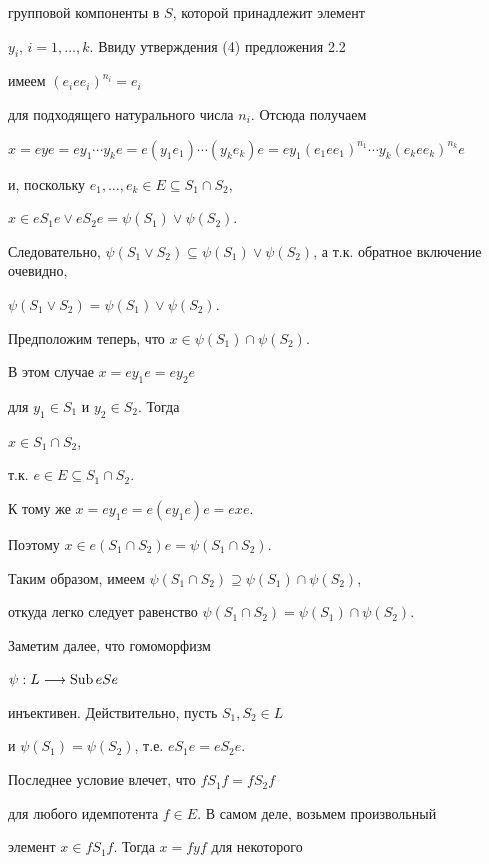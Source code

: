 \begin{pf}
групповой компоненты в $S$, которой принадлежит элемент


$y_i$, $i=1,\dotsc,k$. Ввиду утверждения (4) предложения 2.2


имеем $(e_i ee_i)^{n_i} = e_i$


для подходящего натурального числа $n_i$. Отсюда получаем


$x = eye = ey_1\dotsb y_ke = e(y_1e_1)\dotsb(y_ke_k)e =


ey_1(e_1ee_1)^{n_1}\dotsb y_k(e_kee_k)^{n_k}e$


и, поскольку $e_1,\dotsc,e_k \in E \subseteq S_1 \cap S_2$,


$x \in eS_1e \vee eS_2e = \psi(S_1) \vee \psi(S_2)$.


Следовательно, $\psi(S_1 \vee S_2) \subseteq \psi(S_1) \vee


\psi(S_2)$, а т.к. обратное включение очевидно,


$\psi(S_1 \vee S_2) = \psi(S_1) \vee \psi(S_2)$.


Предположим теперь, что $x \in \psi(S_1) \cap \psi(S_2)$.


В этом случае $x = ey_1e = ey_2e$


для $y_1 \in S_1$ и $y_2 \in S_2$. Тогда


$x \in S_1 \cap S_2$,


т.к. $e \in E \subseteq S_1 \cap S_2$.


К тому же $x = ey_1e = e(ey_1e)e = exe$.


Поэтому $x \in e(S_1 \cap S_2)e = \psi(S_1 \cap S_2)$.


Таким образом, имеем $\psi(S_1 \cap S_2) \supseteq


\psi(S_1) \cap \psi(S_2)$,


откуда легко следует равенство $\psi(S_1 \cap S_2) =


\psi(S_1) \cap \psi(S_2)$.





Заметим далее, что гомоморфизм


$\psi: L \longrightarrow \operatorname{Sub} eSe$


инъективен. Действительно, пусть $S_1, S_2 \in L$


и $\psi(S_1) = \psi(S_2)$, т.е. $eS_1e = eS_2e$.


Последнее условие влечет, что $fS_1f = fS_2f$


для любого идемпотента $f \in E$. В самом деле, возьмем произвольный


элемент $x \in fS_1f$. Тогда $x = fyf$ для некоторого



\end{pf}
